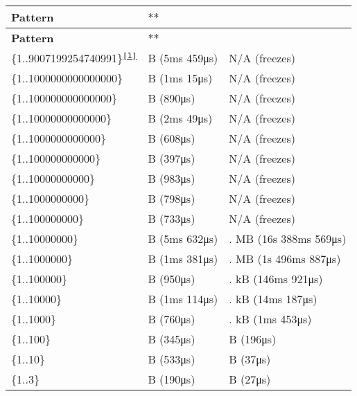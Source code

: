 \tabulinesep=1mm
\begin{longtabu} spread 0pt [c]{*{3}{|X[-1]}|}
\hline
\rowcolor{\tableheadbgcolor}\textbf{ {\bfseries Pattern}  }&\\
\endfirsthead
\hline
\endfoot
\hline
\rowcolor{\tableheadbgcolor}\textbf{ {\bfseries Pattern}  }&\\
\endhead
{\ttfamily \{1..9007199254740991\}}\textsuperscript{\href{#fn1}{\tt \mbox{[}1\mbox{]}}}  &{ B} (5ms 459μs)  &N/A (freezes)   \\
{\ttfamily \{1..1000000000000000\}}  &{ B} (1ms 15μs)  &N/A (freezes)   \\
{\ttfamily \{1..100000000000000\}}  &{ B} (890μs)  &N/A (freezes)   \\
{\ttfamily \{1..10000000000000\}}  &{ B} (2ms 49μs)  &N/A (freezes)   \\
{\ttfamily \{1..1000000000000\}}  &{ B} (608μs)  &N/A (freezes)   \\
{\ttfamily \{1..100000000000\}}  &{ B} (397μs)  &N/A (freezes)   \\
{\ttfamily \{1..10000000000\}}  &{ B} (983μs)  &N/A (freezes)   \\
{\ttfamily \{1..1000000000\}}  &{ B} (798μs)  &N/A (freezes)   \\
{\ttfamily \{1..100000000\}}  &{ B} (733μs)  &N/A (freezes)   \\
{\ttfamily \{1..10000000\}}  &{ B} (5ms 632μs)  &{. MB} (16s 388ms 569μs)   \\
{\ttfamily \{1..1000000\}}  &{ B} (1ms 381μs)  &{. MB} (1s 496ms 887μs)   \\
{\ttfamily \{1..100000\}}  &{ B} (950μs)  &{. kB} (146ms 921μs)   \\
{\ttfamily \{1..10000\}}  &{ B} (1ms 114μs)  &{. kB} (14ms 187μs)   \\
{\ttfamily \{1..1000\}}  &{ B} (760μs)  &{. kB} (1ms 453μs)   \\
{\ttfamily \{1..100\}}  &{ B} (345μs)  &{ B} (196μs)   \\
{\ttfamily \{1..10\}}  &{ B} (533μs)  &{ B} (37μs)   \\
{\ttfamily \{1..3\}}  &{ B} (190μs)  &{ B} (27μs)   \\
\end{longtabu}


